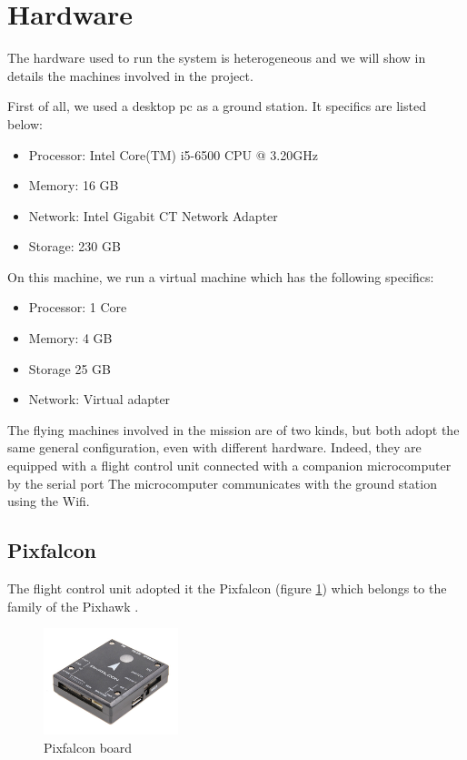\section{Hardware}

The hardware used to run the system is heterogeneous and we will show in details
the machines involved in the project.

First of all, we used a desktop pc as a ground station. It specifics are listed below:
\begin{itemize}
  \item Processor: Intel Core(TM) i5-6500 CPU @ 3.20GHz
  \item Memory: 16 GB
  \item Network: Intel Gigabit CT Network Adapter
  \item Storage: 230 GB
\end{itemize}

On this machine, we run a virtual machine which has the following specifics:
\begin{itemize}
  \item Processor: 1 Core
  \item Memory: 4 GB
  \item Storage 25 GB
  \item Network: Virtual adapter
\end{itemize}

The flying machines involved in the mission are of two kinds, but both adopt the
same general configuration, even with different hardware. Indeed, they are equipped
with a flight control unit connected with a companion microcomputer by the serial port
The microcomputer communicates with the ground station using the Wifi.

\subsection{Pixfalcon}
The flight control unit adopted it the Pixfalcon (figure \ref{fig:hardware_pixfalcon})
which belongs to the family of the Pixhawk \cite{pixhawk}.

\begin{figure}[h]
\centering
\includegraphics[width=0.35\textwidth]{chapters/chapter-03/figures/hardware_pixfalcon.png}
\caption{Pixfalcon board}
\label{fig:hardware_pixfalcon}
\end{figure}

